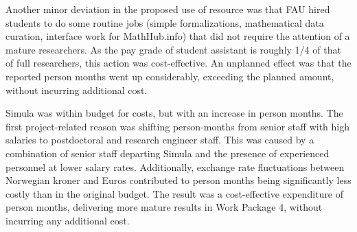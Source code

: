 


Another minor deviation in the proposed use of resource was that FAU hired students to do
some routine jobs (simple formalizations, mathematical data curation, interface work for
MathHub.info) that did not require the attention of a mature researchers. As the pay grade
of student assistant is roughly 1/4 of that of full researchers, this action was
cost-effective. An unplanned effect was that the reported person months went up
considerably, exceeding the planned amount, without incurring additional cost.

Simula was within budget for costs, but with an increase in person months.
The first project-related reason was shifting person-months from senior staff with high salaries
to postdoctoral and research engineer staff.
This was caused by a combination of senior staff departing Simula
and the presence of experienced personnel at lower salary rates.
Additionally, exchange rate fluctuations between Norwegian kroner and Euros contributed
to person months being significantly less costly than in the original budget.
The result was a cost-effective expenditure of person months,
delivering more mature results in Work Package 4,
without incurring any additional cost.


